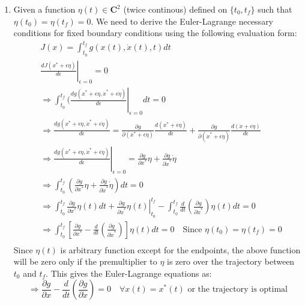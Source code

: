 \begin{enumerate}
\begin{enumerate}
  \end{enumerate}
  \item Given a function $\eta(t) \in \mathbf{C}^2$ (twice continous) defined on $\{t_0, t_f\}$ such that $\eta(t_0) = \eta(t_f) = 0$. We need to derive the Euler-Lagrange necessary conditions for fixed boundary conditions using the following evaluation form:
  \begin{align*}
   &J(x) = \int_{t_0}^{t_f} g(x(t), \dot x(t), t) dt \\
   &\left.\frac{d J(x^* + \epsilon \eta) }{d \epsilon} \right|_{\epsilon = 0} = 0 \\[5pt]
   &\Rightarrow \int_{t_0}^{t_f} (\left.\frac{d g(x^* + \epsilon \eta, {\dot x}^* + \epsilon \dot \eta)}{d \epsilon}\right|_{\epsilon = 0} dt = 0\\
   &\Rightarrow \frac{dg(x^* + \epsilon \eta,{\dot x}^* + \epsilon \dot \eta)}{d \epsilon} = \frac{\partial g}{\partial (x^* + \epsilon \eta)} \frac{d(x^* + \epsilon \eta)}{d\epsilon} + \frac{\partial g}{\partial (\dot x^* + \epsilon \dot \eta)} \frac{d(\dot x + \epsilon \dot \eta)}{d\epsilon}\\
   &\Rightarrow  \left. \frac{dg(x^* + \epsilon \eta,{\dot x}^* + \epsilon \dot \eta)}{d \epsilon}\right|_{\epsilon = 0} = \frac{\partial g}{\partial x^* } \eta + \frac{\partial g}{\partial \dot x^*} \dot \eta\\
   &\Rightarrow \int_{t_0}^{t_f} \left( \frac{\partial g}{\partial x^*} \eta  + \frac{\partial g}{\partial \dot x^*} \dot \eta \right) dt = 0\\
   &\Rightarrow \int_{t_0}^{t_f} \frac{\partial g}{\partial x^*} \eta(t) dt +\left. \frac{\partial g}{\partial \dot x^*} \eta(t)\right|_{t_0}^{t_f} - \int_{t_0}^{t_f} \frac{d}{dt} \left( \frac{\partial g}{\partial \dot x^*} \right) \eta (t) dt = 0 \\
   &\Rightarrow \int_{t_0}^{t_f} \left[ \frac{\partial g}{\partial x^*} - \frac{d}{dt} \left( \frac{\partial g}{\partial \dot x^*} \right)\right] \eta (t) dt = 0 \quad \text{Since } \eta(t_0) = \eta (t_f) = 0\\
  \end{align*}
  Since $\eta(t)$ is arbitrary function except for the endpoints, the above function will be zero only if the premultiplier to $\eta$ is zero over the trajectory between $t_0 $ and $t_f$. This gives the Euler-Lagrange equations as:
  \begin{equation*}
  \Rightarrow  \frac{\partial g}{\partial x} - \frac{d}{dt} \left( \frac{\partial g}{\partial \dot x} \right) = 0 \quad \forall x(t) = x^*(t) \text{ or the trajectory is optimal} 

\end{equation*}
\end{enumerate}
